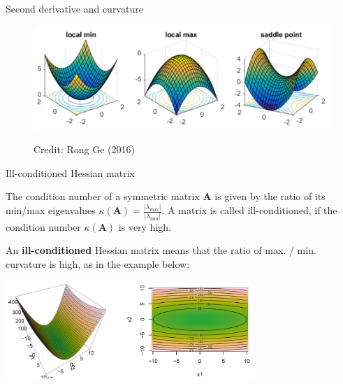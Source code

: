 \begin{vbframe}{Second derivative and curvature}
\begin{figure}
 \begin{center}
  \includegraphics[width=.7\textwidth]{figure/3dim_curvature.png}
 \end{center}
 \tiny{Credit: Rong Ge (2016)}
 \end{figure}

 \end{vbframe}

 \begin{vbframe}{Ill-conditioned Hessian matrix} 


 The condition number of a symmetric matrix $\bm{A}$ is given by the ratio of its min/max eigenvalues $\kappa(\bm{A}) = \frac{|\lambda_{\text{max}}|}{|\lambda_{\text{min}}|}$. A matrix is called ill-conditioned, if the condition number $\kappa(\bm{A})$ is very high. 

 \lz 

 An \textbf{ill-conditioned} Hessian matrix means that the ratio of max. / min. curvature is high, as in the example below: 

\begin{center}
  \includegraphics[width=0.7\textwidth]{figure/ill-con.png}
\end{center}


\end{vbframe}

